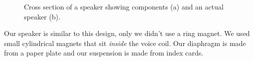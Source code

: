 \documentclass[11pt]{article}
\begin{document}
\begin{figure}[htb]\center
{}
\caption{Cross section of a speaker showing components (a) and an actual speaker (b). \label{fig:speaker}}
\end{figure}

Our speaker is similar to this design, only we didn't use a ring magnet. We used small cylindrical magnets that sit \emph{inside} the voice coil. Our diaphragm is made from a paper plate and our suspension is made from index cards.
	
\end{document}
